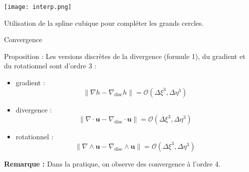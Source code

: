 \documentclass[11pt]{beamer}
\begin{document}
\begin{frame}
\begin{center}
\texttt{[image: interp.png]}
\end{center}

Utilisation de la spline cubique pour compléter les grands cercles.

\end{frame}

\begin{frame}{Convergence}

\begin{block}{Proposition :}
Les versions discrètes de la divergence (formule 1), du gradient et du rotationnel sont d'ordre 3 :

\begin{itemize}
\item gradient :
$$
\| \nabla h - \nabla_{\text{disc}} h  \| = \mathcal{O}\left( \Delta \xi^3, \Delta \eta^3 \right)
$$
\item divergence :
$$
\| \nabla \cdot \mathbf{u} - \nabla_{\text{disc}} \cdot \mathbf{u} \| = \mathcal{O}\left( \Delta \xi^3, \Delta \eta^3 \right)
$$
\item rotationnel :
$$
\| \nabla \wedge \mathbf{u} - \nabla_{\text{disc}} \wedge \mathbf{u}  \| = \mathcal{O}\left( \Delta \xi^3, \Delta \eta^3 \right)
$$
\end{itemize}
\end{block}

\textbf{Remarque :} Dans la pratique, on observe des convergence à l'ordre 4.
\end{frame}




\end{document}

